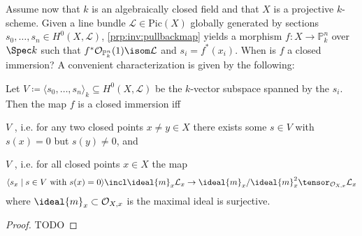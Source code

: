 \documentclass[wip, algebra]{bsteffan-lecturenotes}
\newcommand{\cO}{\mathcal{O}}
\newcommand{\cL}{\mathcal{L}}
\renewcommand{\P}{\mathbb{P}}
\newcommand{\Pic}{\mathrm{Pic}}
\begin{document}
Assume now that $k$ is an algebraically closed field and that $X$ is a projective $k$-scheme.
Given a line bundle $\cL \in \Pic(X)$ globally generated by sections $s_0, \ldots, s_n \in H^0(X, \cL)$, \cref{prp:inv:pullbackmap} yields a morphism $f\colon X \to \P^n_k$ over $\Spec k$ such that $f^* \cO_{\P^n_k}(1) \isom \cL$ and $s_i = f^*(x_i)$.
When is $f$ a closed immersion?
A convenient characterization is given by the following:
\begin{proposition}
	Let $V \coloneq \langle s_0, \ldots, s_n\rangle_k \subseteq H^0(X, \cL)$ be the $k$-vector subspace spanned by the $s_i$.
	Then the map $f$ is a closed immersion iff
	\begin{alphanumerate}
		\item $V$ , i.e. for any two closed points $x \neq y \in X$ there exists some $s \in V$ with $s(x) = 0$ but $s(y) \neq 0$, and
		\item $V$ , i.e. for all closed points $x \in X$ the map 
			\begin{equation*}
				\langle s_x \mid s \in V \text{ with } s(x) = 0\rangle \incl \ideal{m}_x \cL_x \to \ideal{m}_x  / \ideal{m}^2_x \tensor_{\cO_{X, x}} \cL_x
			\end{equation*}
			where $\ideal{m}_x \subset \cO_{X, x}$ is the maximal ideal is surjective.
	\end{alphanumerate}
\end{proposition}
\begin{proof}
	TODO
\end{proof}
\end{document}
